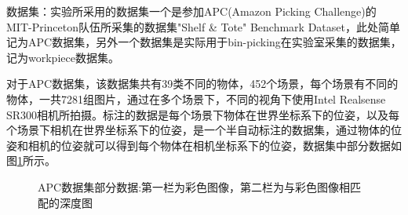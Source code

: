 {\kai 数据集}：实验所采用的数据集一个是参加APC(Amazon Picking Challenge)的MIT-Princeton队伍所采集的数据集"Shelf \& Tote" Benchmark Dataset\cite{apcdataset}，此处简单记为APC数据集，另外一个数据集是实际用于bin-picking在实验室采集的数据集，记为workpiece数据集。

对于APC数据集，该数据集共有39类不同的物体，452个场景，每个场景有不同的物体，一共7281组图片，通过在多个场景下，不同的视角下使用Intel Realsense SR300相机所拍摄。标注的数据是每个场景下物体在世界坐标系下的位姿，以及每个场景下相机在世界坐标系下的位姿，是一个半自动标注的数据集，通过物体的位姿和相机的位姿就可以得到每个物体在相机坐标系下的位姿，数据集中部分数据如图\ref{fig:apc_dataset}所示。
\begin{figure}[ht]
  \centering
  \hskip0.2cm
  \hskip0.2cm
  \hskip0.2cm
  \vfill
  \hskip0.2cm
  \hskip0.2cm
  \hskip0.2cm
  \caption{APC数据集部分数据:第一栏为彩色图像，第二栏为与彩色图像相匹配的深度图}
  \label{fig:apc_dataset}
\end{figure}

